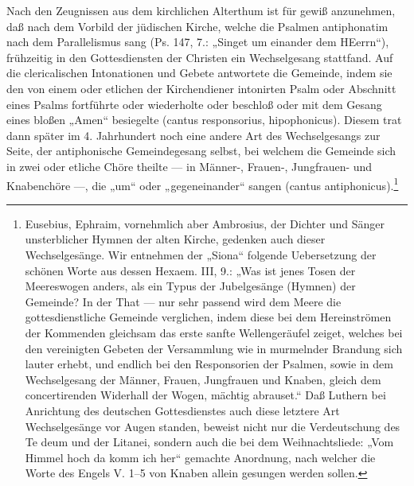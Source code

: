 Nach den Zeugnissen aus dem kirchlichen Alterthum ist für gewiß anzunehmen, daß nach dem Vorbild der jüdischen Kirche, welche die Psalmen antiphonatim nach dem Parallelismus sang (Ps. 147, 7.: „Singet um einander dem HEerrn“), frühzeitig in den Gottesdiensten der Christen ein Wechselgesang stattfand. Auf die clericalischen Intonationen und Gebete antwortete die Gemeinde, indem sie den von einem oder etlichen der Kirchendiener intonirten Psalm oder Abschnitt eines Psalms fortführte oder wiederholte oder beschloß oder mit dem Gesang eines bloßen „Amen“ besiegelte (cantus responsorius, hipophonicus). Diesem trat dann später im 4. Jahrhundert noch eine andere Art des Wechselgesangs zur Seite, der antiphonische Gemeindegesang selbst, bei welchem die Gemeinde sich in zwei oder etliche Chöre theilte — in Männer-, Frauen-, Jungfrauen- und Knabenchöre —, die „um“ oder „gegeneinander“ sangen (cantus antiphonicus).\footnote{Eusebius, Ephraim, vornehmlich aber Ambrosius, der Dichter und Sänger unsterblicher Hymnen der alten Kirche, gedenken auch dieser Wechselgesänge. Wir entnehmen der „Siona“ folgende Uebersetzung der schönen Worte aus dessen Hexaem. III, 9.: „Was ist jenes Tosen der Meereswogen anders, als ein Typus der Jubelgesänge (Hymnen) der Gemeinde? In der That — nur sehr passend wird dem Meere die gottesdienstliche Gemeinde verglichen, indem diese bei dem Hereinströmen der Kommenden gleichsam das erste sanfte Wellengeräufel zeiget, welches bei den vereinigten Gebeten der Versammlung wie in murmelnder Brandung sich lauter erhebt, und endlich bei den Responsorien der Psalmen, sowie in dem Wechselgesang der Männer, Frauen, Jungfrauen und Knaben, gleich dem concertirenden Widerhall der Wogen, mächtig abrauset.“ Daß Luthern bei Anrichtung des deutschen Gottesdienstes auch diese letztere Art Wechselgesänge vor Augen standen, beweist nicht nur die Verdeutschung des Te deum und der Litanei, sondern auch die bei dem Weihnachtsliede: „Vom Himmel hoch da komm ich her“ gemachte Anordnung, nach welcher die Worte des Engels V. 1–5 von Knaben allein gesungen werden sollen.}

